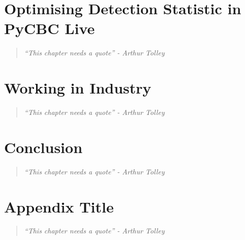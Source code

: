 \documentclass[12pt,twoside]{report} %
\newcommand{\chapterquote}[1]{
  \begin{quote}
    \color{mediumgray}\itshape #1
  \end{quote}
}
\begin{document}
\chapter[Optimising Detection Statistic in PyCBC Live]{Optimising Detection Statistic in PyCBC Live}
\chapterquote{``This chapter needs a quote'' - Arthur Tolley}


\chapter[Working in Industry]{Working in Industry}
\chapterquote{``This chapter needs a quote'' - Arthur Tolley}


\chapter[Conclusion]{Conclusion}
\chapterquote{``This chapter needs a quote'' - Arthur Tolley}


\appendix
\chapter[Appendix]{Appendix Title}
\chapterquote{``This chapter needs a quote'' - Arthur Tolley}


% 
% 
\nocite{*}
\printbibliography
\end{document}
